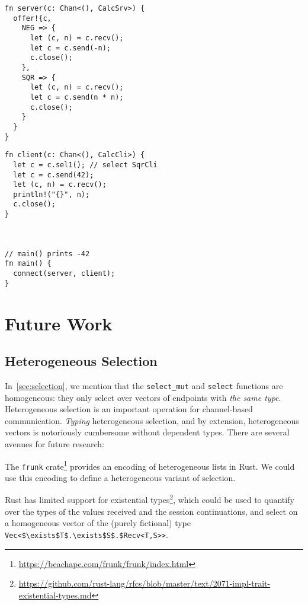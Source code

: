\documentclass[copyright,creativecommons]{eptcs}
\begin{document}
\vspace{-0.5\baselineskip}
\begin{minipage}[t]{0.5\linewidth}
\begin{lstlisting}
fn server(c: Chan<(), CalcSrv>) {
  offer!{c,
    NEG => {
      let (c, n) = c.recv();
      let c = c.send(-n);
      c.close();
    },
    SQR => {
      let (c, n) = c.recv();
      let c = c.send(n * n);
      c.close();
    }
  }
}
\end{lstlisting}
\end{minipage}%
\begin{minipage}[t]{0.5\linewidth}
\begin{lstlisting}
fn client(c: Chan<(), CalcCli>) {
  let c = c.sel1(); // select SqrCli
  let c = c.send(42);
  let (c, n) = c.recv();
  println!("{}", n);
  c.close();
}



// main() prints -42
fn main() {
  connect(server, client);
}
\end{lstlisting}
\end{minipage}
\vspace{-0.25\baselineskip}


\section{Future Work}\label{sec:future-work}

\subsection{Heterogeneous Selection}
In~\cref{sec:selection}, we mention that the \lstinline{select_mut} and \lstinline{select} functions are homogeneous: they only select over vectors of endpoints with \emph{the same type}. Heterogeneous selection is an important operation for channel-based communication. \emph{Typing} heterogeneous selection, and by extension, heterogeneous vectors is notoriously cumbersome without dependent types. There are several avenues for future research:

The \lstinline{frunk} crate\footnote{\url{https://beachape.com/frunk/frunk/index.html}} provides an encoding of heterogeneous lists in Rust. We could use this encoding to define a heterogeneous variant of selection.

Rust has limited support for existential types\footnote{\url{https://github.com/rust-lang/rfcs/blob/master/text/2071-impl-trait-existential-types.md}}, which could be used to quantify over the types of the values received and the session continuations, and select on a homogeneous vector of the (purely fictional) type \lstinline[mathescape=true]{Vec<$\exists$T$.\exists$S$.$Recv<T,S>>}.
\end{document}
